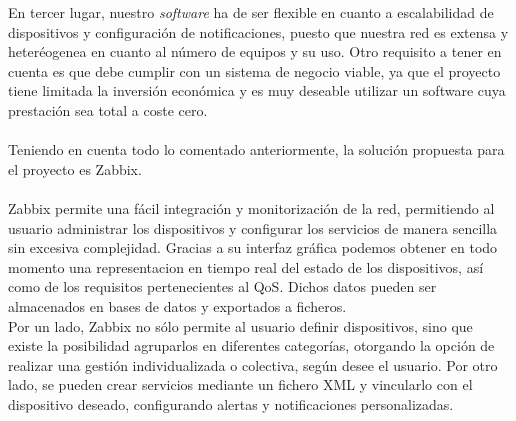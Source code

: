 	En tercer lugar, nuestro \textit{software} ha de ser flexible en cuanto a escalabilidad de dispositivos y configuración de notificaciones, puesto que nuestra red es extensa y heteréogenea en cuanto al número de equipos y su uso. Otro requisito a tener en cuenta es que debe cumplir con un sistema de negocio viable, ya que el proyecto tiene limitada la inversión económica y es muy deseable utilizar un software cuya prestación sea total a coste cero.\\\\
	
	Teniendo en cuenta todo lo comentado anteriormente, la solución propuesta para el proyecto es Zabbix.\\\\
	
	Zabbix permite una fácil integración y monitorización de la red, permitiendo al usuario administrar los dispositivos y configurar los servicios de manera sencilla sin excesiva complejidad. Gracias a su interfaz gráfica podemos obtener en todo momento una representacion en tiempo real del estado de los dispositivos, así como de los requisitos pertenecientes al QoS. Dichos datos pueden ser almacenados en bases de datos y exportados a ficheros.\\
	Por un lado, Zabbix no sólo permite al usuario definir dispositivos, sino que existe la posibilidad agruparlos en diferentes categorías, otorgando la opción de realizar una gestión individualizada o colectiva, según desee el usuario. Por otro lado, se pueden crear servicios mediante un fichero XML y vincularlo con el dispositivo deseado,  configurando alertas y notificaciones personalizadas. 
	